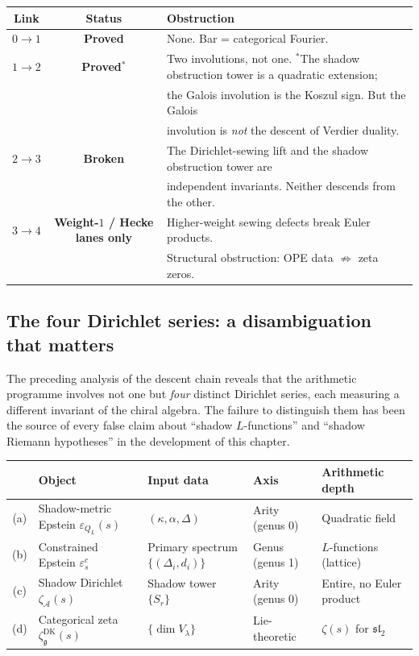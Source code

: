 \documentclass[11pt]{article}
\newcommand{\cA}{\mathcal{A}}
\newcommand{\fg}{\mathfrak{g}}
\newcommand{\fsl}{\mathfrak{sl}}
\begin{document}
\begin{center}
\small
\renewcommand{\arraystretch}{1.3}
\begin{tabular}{@{}ccl@{}}
\textbf{Link} & \textbf{Status} & \textbf{Obstruction} \\
\hline
$0 \to 1$ & \textbf{Proved} & None.  Bar = categorical Fourier. \\[3pt]
$1 \to 2$ & \textbf{Proved}$^*$ &
  Two involutions, not one.
  $^*$The shadow obstruction tower is a quadratic extension;\\
  & & the Galois involution is the Koszul sign.
  But the Galois \\
  & & involution is \emph{not} the descent of Verdier duality. \\[3pt]
$2 \to 3$ & \textbf{Broken} &
  The Dirichlet-sewing lift and the shadow obstruction tower are\\
  & & independent invariants.  Neither descends from the other.\\[3pt]
$3 \to 4$ & \textbf{Weight-$1$ / Hecke lanes only} &
  Higher-weight sewing defects break Euler products.\\
  & & Structural obstruction:
  OPE data $\not\Rightarrow$ zeta zeros.
\end{tabular}
\end{center}

\subsection{The four Dirichlet series: a disambiguation that matters}
\label{sec:four-dirichlet-disambiguation}

The preceding analysis of the descent chain reveals that the
arithmetic programme involves not one but \emph{four} distinct
Dirichlet series, each measuring a different invariant of the
chiral algebra.  The failure to distinguish them has been the
source of every false claim about ``shadow $L$-functions'' and
``shadow Riemann hypotheses'' in the development of this chapter.

\begin{center}
\small
\renewcommand{\arraystretch}{1.3}
\begin{tabular}{@{}cllll@{}}
& \textbf{Object} & \textbf{Input data} & \textbf{Axis}
  & \textbf{Arithmetic depth} \\
\hline
\textup{(a)} & Shadow-metric Epstein $\varepsilon_{Q_L}(s)$
  & $(\kappa, \alpha, \Delta)$
  & Arity (genus 0)
  & Quadratic field \\[3pt]
\textup{(b)} & Constrained Epstein $\varepsilon^c_s$
  & Primary spectrum $\{(\Delta_i, d_i)\}$
  & Genus (genus 1)
  & $L$-functions (lattice) \\[3pt]
\textup{(c)} & Shadow Dirichlet $\zeta_\cA(s)$
  & Shadow tower $\{S_r\}$
  & Arity (genus 0)
  & Entire, no Euler product \\[3pt]
\textup{(d)} & Categorical zeta $\zeta^{\mathrm{DK}}_\fg(s)$
  & $\{\dim V_\lambda\}$
  & Lie-theoretic
  & $\zeta(s)$ for $\fsl_2$
\end{tabular}
\end{center}
\end{document}
